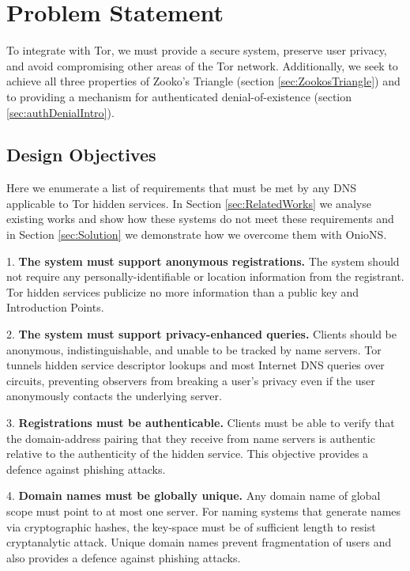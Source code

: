 \documentclass[conference]{IEEEtran}
\begin{document}
\section{Problem Statement}
\label{sec:problemStatement}

To integrate with Tor, we must provide a secure system, preserve user privacy, and avoid compromising other areas of the Tor network. Additionally, we seek to achieve all three properties of Zooko's Triangle (section \ref{sec:ZookosTriangle}) and to providing a mechanism for authenticated denial-of-existence (section \ref{sec:authDenialIntro}).

\subsection{Design Objectives}

Here we enumerate a list of requirements that must be met by any DNS applicable to Tor hidden services. In Section \ref{sec:RelatedWorks} we analyse existing works and show how these systems do not meet these requirements and in Section \ref{sec:Solution} we demonstrate how we overcome them with OnioNS.

1. \textbf{The system must support anonymous registrations.} The system should not require any personally-identifiable or location information from the registrant. Tor hidden services publicize no more information than a public key and Introduction Points.

2. \textbf{The system must support privacy-enhanced queries.} Clients should be anonymous, indistinguishable, and unable to be tracked by name servers. Tor tunnels hidden service descriptor lookups and most Internet DNS queries over circuits, preventing observers from breaking a user's privacy even if the user anonymously contacts the underlying server.

3. \textbf{Registrations must be authenticable.} Clients must be able to verify that the domain-address pairing that they receive from name servers is authentic relative to the authenticity of the hidden service. This objective provides a defence against phishing attacks.

4. \textbf{Domain names must be globally unique.} Any domain name of global scope must point to at most one server. For naming systems that generate names via cryptographic hashes, the key-space must be of sufficient length to resist cryptanalytic attack. Unique domain names prevent fragmentation of users and also provides a defence against phishing attacks.
\end{document}
